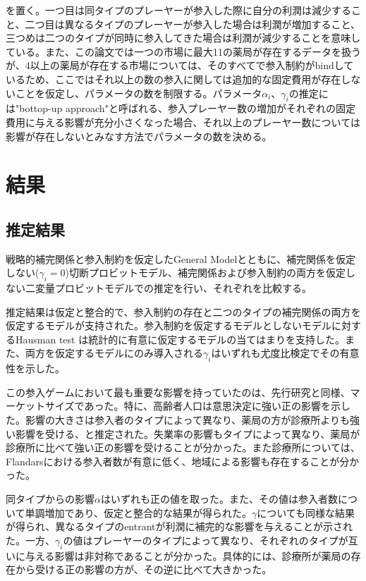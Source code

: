 \documentclass[11pt]{jsarticle}
\begin{document}
を置く。一つ目は同タイプのプレーヤーが参入した際に自分の利潤は減少すること、二つ目は異なるタイプのプレーヤーが参入した場合は利潤が増加すること、三つめは二つのタイプが同時に参入してきた場合は利潤が減少することを意味している。また、この論文では一つの市場に最大11の薬局が存在するデータを扱うが、4以上の薬局が存在する市場については、そのすべてで参入制約がbindしているため、ここではそれ以上の数の参入に関しては追加的な固定費用が存在しないことを仮定し、パラメータの数を制限する。パラメータ$\alpha_i$、$\gamma_i$の推定には"bottop-up approach"と呼ばれる、参入プレーヤー数の増加がそれぞれの固定費用に与える影響が充分小さくなった場合、それ以上のプレーヤー数については影響が存在しないとみなす方法でパラメータの数を決める。

\section{結果}

\subsection{推定結果}

戦略的補完関係と参入制約を仮定したGeneral Modelとともに、補完関係を仮定しない($\gamma_i = 0$)切断プロビットモデル、補完関係および参入制約の両方を仮定しない二変量プロビットモデルでの推定を行い、それぞれを比較する。

推定結果は仮定と整合的で、参入制約の存在と二つのタイプの補完関係の両方を仮定するモデルが支持された。参入制約を仮定するモデルとしないモデルに対するHausman test は統計的に有意に仮定するモデルの当てはまりを支持した。また、両方を仮定するモデルにのみ導入される$\gamma_i$はいずれも尤度比検定でその有意性を示した。

この参入ゲームにおいて最も重要な影響を持っていたのは、先行研究と同様、マーケットサイズであった。特に、高齢者人口は意思決定に強い正の影響を示した。影響の大きさは参入者のタイプによって異なり、薬局の方が診療所よりも強い影響を受ける、と推定された。失業率の影響もタイプによって異なり、薬局が診療所に比べて強い正の影響を受けることが分かった。また診療所については、Flandarsにおける参入者数が有意に低く、地域による影響も存在することが分かった。

同タイプからの影響$\alpha$はいずれも正の値を取った。また、その値は参入者数について単調増加であり、仮定と整合的な結果が得られた。$\gamma$についても同様な結果が得られ、異なるタイプのentrantが利潤に補完的な影響を与えることが示された。一方、$\gamma_i$の値はプレーヤーのタイプによって異なり、それぞれのタイプが互いに与える影響は非対称であることが分かった。具体的には、診療所が薬局の存在から受ける正の影響の方が、その逆に比べて大きかった。
\end{document}
